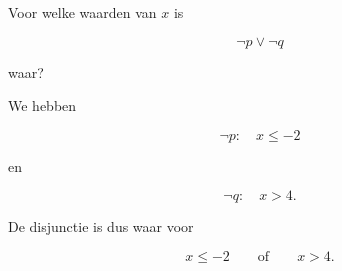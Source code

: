 \documentclass{ximera}
\begin{document}
\begin{oefening}{\oefU \ESS}
\begin{question}
\end{question}



\begin{question}

Voor welke waarden van $x$ is

\[
\neg p\lor\neg q
\]

waar?

\begin{oplossing}

We hebben

\[
\neg p:\quad x\leq-2
\]

en

\[
\neg q:\quad x>4.
\]

De disjunctie is dus waar voor

\[
x\leq-2
\qquad\text{of}\qquad
x>4.
\]

\end{oplossing}

\end{question}

\end{oefening}
\end{document}
